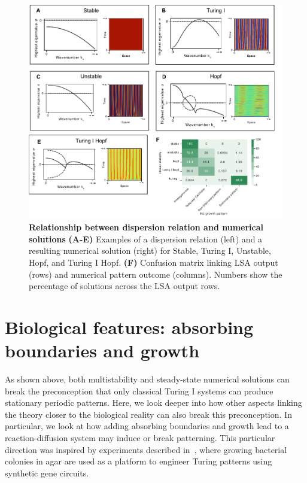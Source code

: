 \begin{figure}[H]
    \includegraphics[width=1\textwidth]{figures/dispersion} %
    \caption{\textbf{Relationship between dispersion relation and numerical solutions} \textbf{(A-E)} Examples of a dispersion relation (left) and a resulting numerical solution (right) for Stable, Turing I, Unstable, Hopf, and Turing I Hopf. \textbf{(F)} Confusion matrix linking LSA output (rows) and numerical pattern outcome (columns). Numbers show the percentage of solutions across the LSA output rows.}
    \label{fig:dispersions} %
\end{figure}


\section{Biological features: absorbing boundaries and growth}
As shown above, both multistability and steady-state numerical solutions can break the preconception that only classical Turing I systems can produce stationary periodic patterns.
Here, we look deeper into how other aspects linking the theory closer to the biological reality can also break this preconception.
In particular, we look at how adding absorbing boundaries and growth lead to a reaction-diffusion system may induce or break patterning.
This particular direction was inspired by experiments described in~\parencite{Oliver2023}, where growing bacterial colonies in agar are used as a platform to engineer Turing patterns using synthetic gene circuits.

